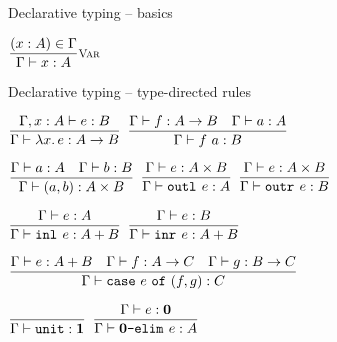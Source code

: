\documentclass{beamer}
\begin{document}
\begin{frame}{Declarative typing -- basics}

\begin{center}
  $\infrule[Var]{\sidecond{(x : A) \in \Gamma}}{\typing{x}{A}}$
\end{center}

\end{frame}

\begin{frame}{Declarative typing -- type-directed rules}

\begin{center}
  $\infrule{\typing[\extend{\Gamma}{x}{A}]{e}{B}}{\typing{\fun{x}{e}}{\Fun{A}{B}}}$ \quad
  $\infrule{\typing{f}{\Fun{A}{B}} \quad \typing{a}{A}}{\typing{\app{f}{a}}{B}}$

  \vspace{2em}

  $\infrule{\typing{a}{A} \quad \typing{b}{B}}{\typing{\pair{a}{b}}{\Prod{A}{B}}}$ \quad
  $\infrule{\typing{e}{\Prod{A}{B}}}{\typing{\outl{e}}{A}}$ \quad
  $\infrule{\typing{e}{\Prod{A}{B}}}{\typing{\outr{e}}{B}}$

  \vspace{2em}

  $\infrule{\typing{e}{A}}{\typing{\inl{e}}{\Sum{A}{B}}}$ \quad
  $\infrule{\typing{e}{B}}{\typing{\inr{e}}{\Sum{A}{B}}}$

  \vspace{2em}

  $\infrule{\typing{e}{\Sum{A}{B}} \quad \typing{f}{\Fun{A}{C}} \quad \typing{g}{\Fun{B}{C}}}{\typing{\case{e}{f}{g}}{C}}$

  \vspace{2em}

  $\infrule{}{\typing{\unit}{\Unit}}$ \quad
  $\infrule{\typing{e}{\Empty}}{\typing{\emptyelim{e}}{A}}$
\end{center}

\end{frame}
\end{document}

